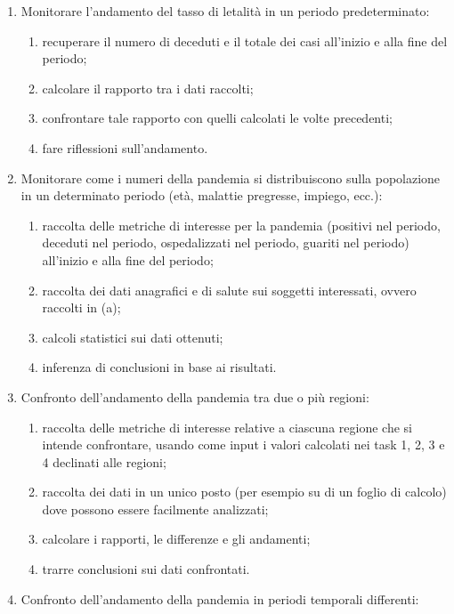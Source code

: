\begin{enumerate}[resume]
    \item Monitorare l'andamento del tasso di letalità in un periodo predeterminato:
    \begin{enumerate}[label=\alph*.]
        \item recuperare il numero di deceduti e il totale dei casi all'inizio e alla fine del periodo;
        \item calcolare il rapporto tra i dati raccolti;
        \item confrontare tale rapporto con quelli calcolati le volte precedenti;
        \item fare riflessioni sull'andamento.
    \end{enumerate}
    \item Monitorare come i numeri della pandemia si distribuiscono sulla popolazione in un determinato periodo (età, malattie pregresse, impiego, ecc.):
    \begin{enumerate}[label=\alph*.]
        \item raccolta delle metriche di interesse per la pandemia (positivi nel periodo, deceduti nel periodo, ospedalizzati nel periodo, guariti nel periodo) all'inizio e alla fine del periodo;
        \item raccolta dei dati anagrafici e di salute sui soggetti interessati, ovvero raccolti in (a);
        \item calcoli statistici sui dati ottenuti;
        \item inferenza di conclusioni in base ai risultati.
    \end{enumerate}
    \item Confronto dell'andamento della pandemia tra due o più regioni:
    \begin{enumerate}[label=\alph*.]
        \item raccolta delle metriche di interesse relative a ciascuna regione che si intende confrontare, usando come input i valori calcolati nei task 1, 2, 3 e 4 declinati alle regioni;
        \item raccolta dei dati in un unico posto (per esempio su di un foglio di calcolo) dove possono essere facilmente analizzati;
        \item calcolare i rapporti, le differenze e gli andamenti;
        \item trarre conclusioni sui dati confrontati.
    \end{enumerate}
    \item Confronto dell'andamento della pandemia in periodi temporali differenti:

\end{enumerate}
